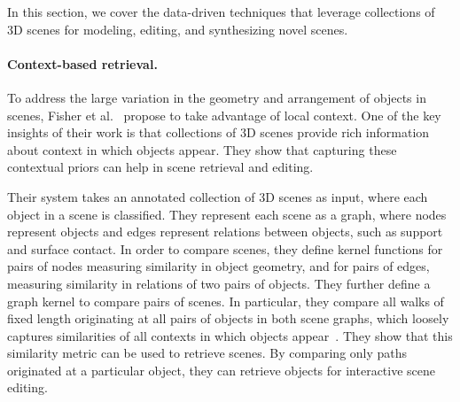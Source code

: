 In this section, we cover the data-driven techniques that leverage collections of 3D scenes for modeling, editing, and synthesizing novel scenes.


\paragraph*{Context-based retrieval.}
To address the large variation in the geometry and arrangement of objects in scenes, Fisher et al.~\cite{Fisher:2010:CSM,Fisher:2011:CSR} propose to take advantage of local context.  One of the key insights of their work is that collections of 3D scenes provide rich information about context in which objects appear. They show that capturing these contextual priors can help in scene retrieval and editing.

Their system takes an annotated collection of 3D scenes as input, where each object in a scene is classified. They represent each scene as a graph, where nodes represent objects and edges represent relations between objects, such as support and surface contact. In order to compare scenes, they define kernel functions for pairs of nodes measuring similarity in object geometry, and for pairs of edges, measuring similarity in relations of two pairs of objects.  They further define a graph kernel to compare pairs of scenes.  In particular, they compare all walks of fixed length originating at all pairs of objects in both scene graphs, which loosely captures similarities of all contexts in which objects appear~\cite{Fisher:2011:CSR}.  They show that this similarity metric can be used to retrieve scenes. By comparing only paths originated at a particular object, they can retrieve objects for interactive scene editing.




